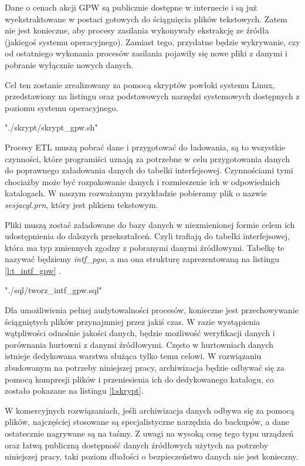 Dane o cenach akcji GPW są publicznie dostępne w internecie 
 i są już wyekstraktowane w postaci gotowych do ściągnięcia plików tekstowych.
Zatem nie jest konieczne, aby procesy zasilania wykonywały ekstrakcję ze źródła (jakiegoś systemu operacyjnego).
Zamiast tego, przydatne będzie wykrywanie,
czy od ostatniego wykonania procesów zasilania pojawiły się nowe pliki z danymi 
 i pobranie wyłącznie nowych danych.
 
Cel ten zostanie zrealizowany za pomocą skryptów powłoki systemu Linux, przedstawiony na listingu 
oraz podstawowych narzędzi systemowych dostępnych z poziomu systemu operacyjnego. 


 {"./skrypt/skrypt_gpw.sh"} 


Procesy ETL muszą pobrać dane i przygotować do ładowania, 
 są to wszystkie czynności, które programiści uznają za potrzebne 
 w celu przygotowania danych do poprawnego załadowania danych do tabelki interfejsowej.
Czynnościami tymi chociażby może być rozpakowanie danych i rozmieszenie ich w odpowiednich katalogach.
W naszym rozważanym przykładzie pobieramy plik o nazwie \textit{sesjacgl.prn},
 który jest plikiem tekstowym.

Pliki muszą zostać załadowane do bazy danych w niezmienionej formie celem ich udostępnienia do dalszych przekształceń.
Czyli trafiają do tabelki interfejsowej, która ma typ zmiennych zgodny z pobranymi danymi źródłowymi. 
Tabelkę te nazywać będziemy \textit{intf\_pgw}, a ma ona strukturę zaprezentowaną na listingu \ref{l:t_intf_gpw} .

 {"./sql/tworz_intf_gpw.sql"} 


Dla umożliwienia pełnej audytowalności procesów,
 konieczne jest przechowywanie ściągniętych plików przynajmniej przez jakiś czas.
W razie wystąpienia wątpliwości odnośnie jakości danych,
 będzie możliwość weryfikacji danych i porównania hurtowni z danymi źródłowymi. 
Często w hurtowniach danych istnieje dedykowana warstwa służąca tylko temu celowi. 
W rozwiązaniu zbudowanym na potrzeby niniejszej pracy,
 archiwizacja będzie odbywać się za pomocą kompresji plików i przeniesienia ich do dedykowanego katalogu, 
 co zostało pokazane na listingu \ref{l:skrypt}. 
 
W komercyjnych rozwiązaniach, jeśli archiwizacja danych odbywa się za pomocą plików,
 najczęściej stosowane są specjalistyczne narzędzia do backupów,
 a dane ostatecznie nagrywane są na taśmy. Z uwagi na wysoką cenę tego typu urządzeń 
oraz łatwą publiczną dostępność danych źródłowych użytych na potrzeby niniejszej pracy, 
taki poziom dbałości o bezpieczeństwo danych nie jest konieczny. 

